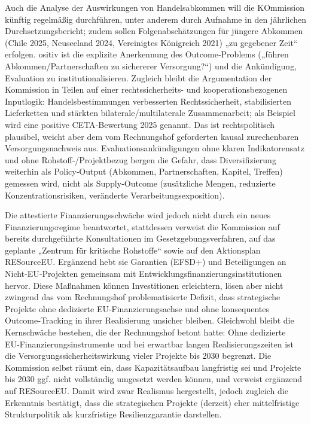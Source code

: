 \documentclass[12pt,a4paper,oneside]{book} %
\begin{document}
Auch die Analyse der Auswirkungen von Handelsabkommen will die KOmmission künftig regelmäßig durchführen, unter anderem durch Aufnahme in den jährlichen Durchsetzungsbericht; zudem sollen Folgenabschätzungen für jüngere Abkommen (Chile 2025, Neuseeland 2024, Vereinigtes Königreich 2021) „zu gegebener Zeit“ erfolgen. ositiv ist die explizite Anerkennung des Outcome‑Problems („führen Abkommen/Partnerschaften zu sichererer Versorgung?“) und die Ankündigung, Evaluation zu institutionalisieren.  Zugleich bleibt die Argumentation der Kommission in Teilen auf einer rechtssicherheits- und kooperationsbezogenen Inputlogik: Handelsbestimmungen verbesserten Rechtssicherheit, stabilisierten Lieferketten und stärkten bilaterale/multilaterale Zusammenarbeit; als Beispiel wird eine positive CETA‑Bewertung 2025 genannt.  Das ist rechtspolitisch plausibel, weicht aber dem vom Rechnungshof geforderten kausal zurechenbaren Versorgungsnachweis aus. Evaluationsankündigungen ohne klaren Indikatorensatz und ohne Rohstoff‑/Projektbezug bergen die Gefahr, dass Diversifizierung weiterhin als Policy‑Output (Abkommen, Partnerschaften, Kapitel, Treffen) gemessen wird, nicht als Supply‑Outcome (zusätzliche Mengen, reduzierte Konzentrationsrisiken, veränderte Verarbeitungsexposition).

Die attestierte Finanzierungsschwäche wird jedoch nicht durch ein neues Finanzierungsregime beantwortet, stattdessen verweist die Kommission auf bereits durchgeführte Konsultationen im Gesetzgebungsverfahren, auf das geplante „Zentrum für kritische Rohstoffe“ sowie auf den Aktionsplan RESourceEU.  Ergänzend hebt sie Garantien (EFSD+) und Beteiligungen an Nicht‑EU‑Projekten gemeinsam mit Entwicklungsfinanzierungsinstitutionen hervor. Diese Maßnahmen können Investitionen erleichtern, lösen aber nicht zwingend das vom Rechnungshof problematisierte Defizit, dass strategische Projekte ohne dedizierte EU‑Finanzierungsachse und ohne konsequentes Outcome‑Tracking in ihrer Realisierung unsicher bleiben. Gleichwohl bleibt die Kernschwäche bestehen, die der Rechnungshof betont hatte: Ohne dedizierte EU‑Finanzierungsinstrumente und bei erwartbar langen Realisierungszeiten ist die Versorgungssicherheitswirkung vieler Projekte bis 2030 begrenzt. Die Kommission selbst räumt ein, dass Kapazitätsaufbau langfristig sei und Projekte bis 2030 ggf. nicht vollständig umgesetzt werden können, und verweist ergänzend auf RESourceEU.  Damit wird zwar Realismus hergestellt, jedoch zugleich die Erkenntnis bestätigt, dass die strategischen Projekte (derzeit) eher mittelfristige Strukturpolitik als kurzfristige Resilienzgarantie darstellen.
\end{document}
